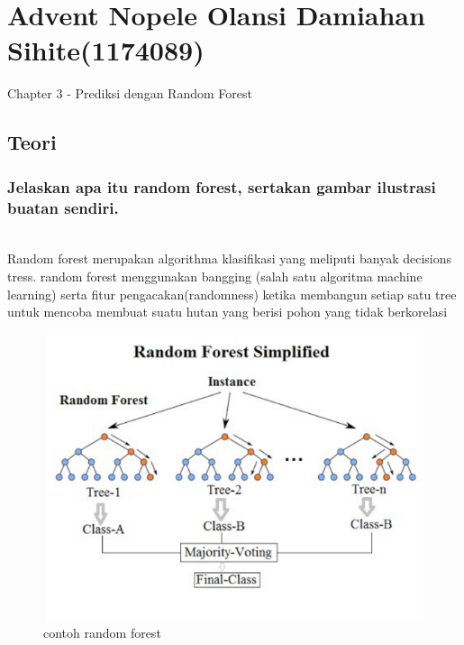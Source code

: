 \section{Advent Nopele Olansi Damiahan Sihite(1174089)}
Chapter 3 - Prediksi dengan Random Forest
\subsection{Teori}
\subsubsection{ Jelaskan apa itu random forest, sertakan gambar ilustrasi buatan sendiri.}
\hfill\\
Random forest merupakan algorithma klasifikasi yang meliputi banyak decisions tress. random forest menggunakan bangging (salah satu algoritma machine learning) serta fitur pengacakan(randomness) ketika membangun setiap satu tree untuk mencoba membuat suatu hutan yang berisi pohon yang tidak berkorelasi

\begin{figure}[H]
	\centering
	\includegraphics[width=12cm]{figures/1174089/3/randomforest.png}
	\caption{contoh random forest}
\end{figure}


